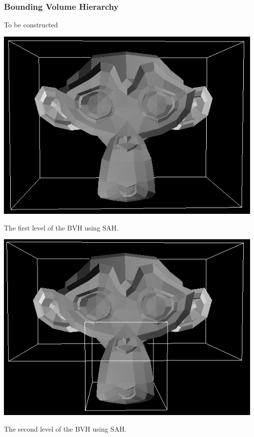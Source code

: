 \documentclass{article}
\begin{document}
    \subsubsection{Bounding Volume Hierarchy}
    To be constructed

    \begin{center}
        \includegraphics[scale=0.75]{images/bvh_level_one.png}

        The first level of the BVH using SAH.

        \includegraphics[scale=0.75]{images/bvh_level_two.png}

        The second level of the BVH using SAH.


\end{center}
\end{document}
